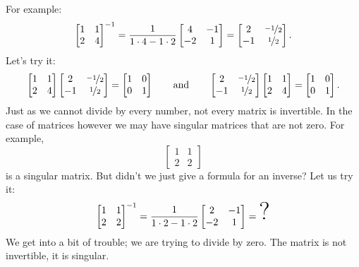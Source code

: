 For example:
\begin{equation*}
\begin{bmatrix}
1 & 1 \\
2 & 4
\end{bmatrix}^{-1}
=
\frac{1}{1\cdot 4-1 \cdot 2}
\begin{bmatrix}
4 & -1 \\
-2 & 1
\end{bmatrix}
=
\begin{bmatrix}
2 & \nicefrac{-1}{2} \\
-1 & \nicefrac{1}{2}
\end{bmatrix} .
\end{equation*}
Let's try it:
\begin{equation*}
\begin{bmatrix}
1 & 1 \\
2 & 4
\end{bmatrix}
\begin{bmatrix}
2 & \nicefrac{-1}{2} \\
-1 & \nicefrac{1}{2}
\end{bmatrix}
=
\begin{bmatrix}
1 & 0 \\
0 & 1
\end{bmatrix}
\qquad
\text{and}
\qquad
\begin{bmatrix}
2 & \nicefrac{-1}{2} \\
-1 & \nicefrac{1}{2}
\end{bmatrix}
\begin{bmatrix}
1 & 1 \\
2 & 4
\end{bmatrix}
=
\begin{bmatrix}
1 & 0 \\
0 & 1
\end{bmatrix} .
\end{equation*}
Just as we cannot divide by every number, not every matrix is
invertible.  In the case of matrices however we may have singular
matrices that are not zero.  For example,
\begin{equation*}
\begin{bmatrix}
1 & 1 \\
2 & 2
\end{bmatrix}
\end{equation*}
is a singular matrix.  But didn't we just give a formula for an inverse?
Let us try it:
\begin{equation*}
\begin{bmatrix}
1 & 1 \\
2 & 2
\end{bmatrix}^{-1}
=
\frac{1}{1\cdot 2-1 \cdot 2}
\begin{bmatrix}
2 & -1 \\
-2 & 1
\end{bmatrix}
=
\text{\Huge ?}
\end{equation*}
We get into a bit of trouble; we are trying to divide by zero.
The matrix is not invertible, it is singular.

